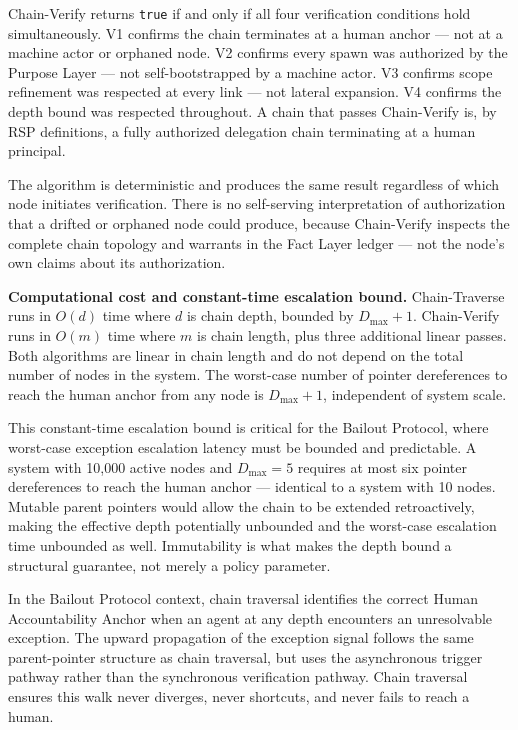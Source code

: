 Chain-Verify returns \texttt{true} if and only if all four verification conditions hold simultaneously. V1 confirms the chain terminates at a human anchor — not at a machine actor or orphaned node. V2 confirms every spawn was authorized by the Purpose Layer — not self-bootstrapped by a machine actor. V3 confirms scope refinement was respected at every link — not lateral expansion. V4 confirms the depth bound was respected throughout. A chain that passes Chain-Verify is, by RSP definitions, a fully authorized delegation chain terminating at a human principal.

The algorithm is deterministic and produces the same result regardless of which node initiates verification. There is no self-serving interpretation of authorization that a drifted or orphaned node could produce, because Chain-Verify inspects the complete chain topology and warrants in the Fact Layer ledger — not the node's own claims about its authorization.

\medskip
\noindent\textbf{Computational cost and constant-time escalation bound.} Chain-Traverse runs in $O(d)$ time where $d$ is chain depth, bounded by $D_{\max} + 1$. Chain-Verify runs in $O(m)$ time where $m$ is chain length, plus three additional linear passes. Both algorithms are linear in chain length and do not depend on the total number of nodes in the system. The worst-case number of pointer dereferences to reach the human anchor from any node is $D_{\max} + 1$, independent of system scale.

This constant-time escalation bound is critical for the Bailout Protocol, where worst-case exception escalation latency must be bounded and predictable. A system with 10,000 active nodes and $D_{\max} = 5$ requires at most six pointer dereferences to reach the human anchor — identical to a system with 10 nodes. Mutable parent pointers would allow the chain to be extended retroactively, making the effective depth potentially unbounded and the worst-case escalation time unbounded as well. Immutability is what makes the depth bound a structural guarantee, not merely a policy parameter.

In the Bailout Protocol context, chain traversal identifies the correct Human Accountability Anchor when an agent at any depth encounters an unresolvable exception. The upward propagation of the exception signal follows the same parent-pointer structure as chain traversal, but uses the asynchronous trigger pathway rather than the synchronous verification pathway. Chain traversal ensures this walk never diverges, never shortcuts, and never fails to reach a human.

